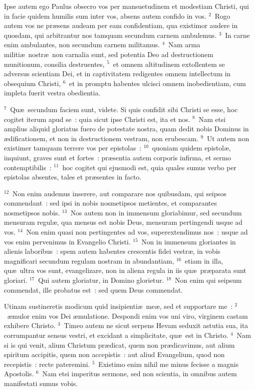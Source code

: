\bchapter
\lettrine[lines=3,image=true,loversize=0.05,lraise=-0.03]{I}{}pse autem ego Paulus obsecro vos per mansuetudinem et modestiam Christi, qui in facie quidem humilis sum inter vos, absens autem confido in vos.
${}^{2}$~Rogo autem vos ne pr\ae sens audeam per eam confidentiam, qua existimor audere in quosdam, qui arbitrantur nos tamquam secundum carnem ambulemus.
${}^{3}$~In carne enim ambulantes, non secundum carnem militamus.
${}^{4}$~Nam arma militi\ae\ nostr\ae\ non carnalia sunt, sed potentia Deo ad destructionem munitionum, consilia destruentes,
${}^{5}$~et omnem altitudinem extollentem se adversus scientiam Dei, et in captivitatem redigentes omnem intellectum in obsequium Christi,
${}^{6}$~et in promptu habentes ulcisci omnem inobedientiam, cum impleta fuerit vestra obedientia.


${}^{7}$~Qu\ae\ secundum faciem sunt, videte. Si quis confidit sibi Christi se esse, hoc cogitet iterum apud se~: quia sicut ipse Christi est, ita et nos.
${}^{8}$~Nam etsi amplius aliquid gloriatus fuero de potestate nostra, quam dedit nobis Dominus in \ae dificationem, et non in destructionem vestram, non erubescam.
${}^{9}$~Ut autem non existimer tamquam terrere vos per epistolas~:
${}^{10}$~quoniam quidem epistol\ae , inquiunt, graves sunt et fortes~: pr\ae sentia autem corporis infirma, et sermo contemptibilis~:
${}^{11}$~hoc cogitet qui ejusmodi est, quia quales sumus verbo per epistolas absentes, tales et pr\ae sentes in facto.


${}^{12}$~Non enim audemus inserere, aut comparare nos quibusdam, qui seipsos commendant~: sed ipsi in nobis nosmetipsos metientes, et comparantes nosmetipsos nobis.
${}^{13}$~Nos autem non in immensum gloriabimur, sed secundum mensuram regul\ae , qua mensus est nobis Deus, mensuram pertingendi usque ad vos.
${}^{14}$~Non enim quasi non pertingentes ad vos, superextendimus nos~: usque ad vos enim pervenimus in Evangelio Christi.
${}^{15}$~Non in immensum gloriantes in alienis laboribus~: spem autem habentes crescentis fidei vestr\ae , in vobis magnificari secundum regulam nostram in abundantiam,
${}^{16}$~etiam in illa, qu\ae\ ultra vos sunt, evangelizare, non in aliena regula in iis qu\ae\ pr\ae parata sunt gloriari.
${}^{17}$~Qui autem gloriatur, in Domino glorietur.
${}^{18}$~Non enim qui seipsum commendat, ille probatus est~: sed quem Deus commendat.

\bchapter
\lettrine[lines=3,image=true,loversize=0.05,lraise=-0.03]{U}{}tinam sustineretis modicum quid insipienti\ae\ me\ae , sed et supportare me~:
${}^{2}$~\ae mulor enim vos Dei \ae mulatione. Despondi enim vos uni viro, virginem castam exhibere Christo.
${}^{3}$~Timeo autem ne sicut serpens Hevam seduxit astutia sua, ita corrumpantur sensus vestri, et excidant a simplicitate, qu\ae\ est in Christo.
${}^{4}$~Nam si is qui venit, alium Christum pr\ae dicat, quem non pr\ae dicavimus, aut alium spiritum accipitis, quem non accepistis~: aut aliud Evangelium, quod non recepistis~: recte pateremini.
${}^{5}$~Existimo enim nihil me minus fecisse a magnis Apostolis.
${}^{6}$~Nam etsi imperitus sermone, sed non scientia, in omnibus autem manifestati sumus vobis.


